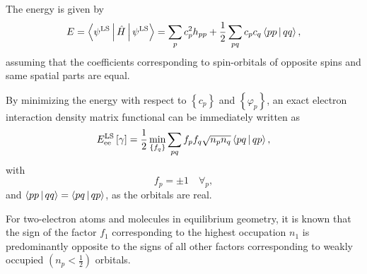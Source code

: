 \begin{enumerate}
        The energy is given by 
        \begin{equation}
            E = \Braket{\psi^{\text{LS}} | \hat{H} | \psi^{\text{LS}}} =
            \sum_{p} c_p^2 h_{pp} + \frac{1}{2} \sum_{pq} 
            c_p c_q \Braket{pp | qq}
            ,
        \end{equation}
        assuming that the coefficients corresponding to spin-orbitals of opposite
        spins and same spatial parts are equal.

        By minimizing the energy with respect to $\left\{ c_p \right\}$ and
        $\left\{ \varphi_p \right\}$, an exact electron interaction density
        matrix functional can be immediately written as 
        \begin{equation} \label{eq:LS-functional}
            E_{\text{ee}}^{\text{LS}} \left[ \fordm \right] =
            \frac{1}{2} \min_{ \left\{ f_q \right\}} \sum_{pq}
            f_p f_q \sqrt{n_p n_q} \Braket{pq | qp}
            ,
        \end{equation}
        with 
        \begin{equation}
            f_p = \pm 1\quad \forall_p
            ,
        \end{equation}
        and $ \Braket{pp | qq} = \Braket{pq | qp}$, as the orbitals are real.

        For two-electron atoms and molecules in equilibrium geometry, it is 
        known that the sign of the factor $f_1$ corresponding to the highest 
        occupation $n_1$ is predominantly opposite to the signs of all other 
        factors corresponding to weakly occupied $\left( n_p < \frac{1}{2} \right)$
        orbitals.


\end{enumerate}
